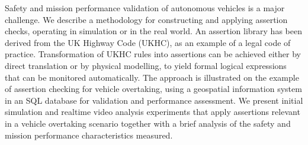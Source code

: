 Safety and mission performance validation of autonomous vehicles is a major challenge. We describe a methodology for constructing and applying assertion checks, operating in simulation or in the real world. 
%
An assertion library has been derived from the UK Highway Code (UKHC), as an example of a legal code of practice. 
%
Transformation of UKHC rules into assertions can be achieved either by direct translation or by physical modelling, to yield formal logical expressions that can be monitored automatically.
%
The approach is illustrated on the example of assertion checking for vehicle overtaking, using a geospatial information system in an SQL database for validation and performance assessment.
%
We present initial simulation and realtime video analysis experiments that apply assertions relevant in a vehicle overtaking scenario together with a brief analysis of the safety and mission performance characteristics measured.
%
